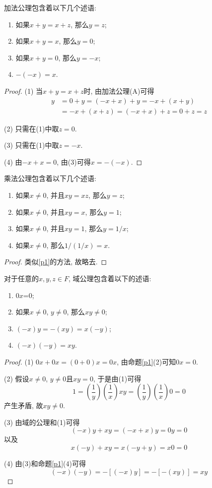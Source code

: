 \documentclass[cn,12pt,math=mtpro2,citestyle=gb7714-2015,bibstyle=gb7714-2015,twocol]{elegantbook}
\begin{document}
\begin{proposition}\label{p1}
加法公理包含着以下几个述语:
\begin{enumerate}[label=(\arabic*)]
\item 如果$x+y=x+z$, 那么$y=z$;
\item 如果$x+y=x$, 那么$y=0$;
\item 如果$x+y=0$, 那么$y=-x$;
\item $-(-x)=x$.
\end{enumerate}
\end{proposition}
\begin{proof}
  (1) 当$x+y=x+z$时, 由加法公理(A)可得
  \begin{align*}
  y&=0+y=(-x+x)+y=-x+(x+y) \\
  &=-x+(x+z)=(-x+x)+z=0+z=z
  \end{align*}

  (2) 只需在(1)中取$z=0$.

  (3) 只需在(1)中取$z=-x$.

  (4) 由$-x+x=0$, 由(3)可得$x=-(-x)$.
\end{proof}
\begin{proposition}
乘法公理包含着以下几个述语:
\begin{enumerate}[label=(\arabic*)]
\item 如果$x\neq 0$, 并且$xy=xz$, 那么$y=z$;
\item 如果$x\neq 0$, 并且$xy=x$, 那么$y=1$;
\item 如果$x\neq 0$, 并且$xy=1$, 那么$y=1/x$;
\item 如果$x\neq 0$, 那么$1/(1/x)=x$.
\end{enumerate}
\end{proposition}
\begin{proof}
  类似\ref{p1}的方法, 故略去.
\end{proof}

\begin{proposition}\label{p2}
对于任意的$ x, y, z \in F$, 域公理包含着以下的述语:
\begin{enumerate}[label=(\arabic*)]
\item $0x$=0;
\item 如果$x\neq0$, $y\neq0$, 那么$xy\neq0$;
\item $(-x)y=-(xy)=x(-y)$;
\item $(-x)(-y)=xy$.
\end{enumerate}
\end{proposition}
\begin{proof}
  (1) $0x+0x=(0+0)x=0x$, 由命题\ref{p1}(2)可知$0x=0$.

  (2) 假设$x\neq0$, $y\neq0$且$xy=0$, 于是由(1)可得
  $$1=\left(\frac{1}{y}\right)\left(\frac{1}{x}\right)xy=\left(\frac{1}{y}\right)\left(\frac{1}{x}\right)0=0$$
  产生矛盾, 故$xy\neq0$.

  (3) 由域的公理和(1)可得
  $$(-x)y+xy=(-x+x)y=0y=0$$
  以及
  $$x(-y)+xy=x(-y+y)=x0=0$$

  (4) 由(3)和命题\ref{p1}(4)可得
  $$(-x)(-y)=-[(-x)y]=-[-(xy)]=xy$$
\end{proof}
\end{document}
